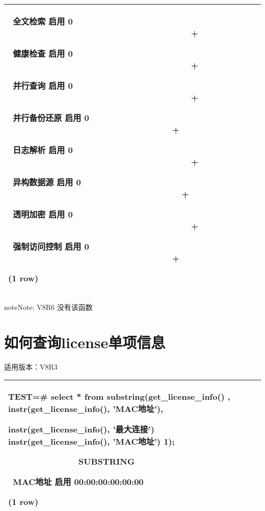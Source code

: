 \documentclass[letterpaper,10pt,english]{sphinxmanual}
\begin{document}
\begin{savenotes}
\begin{tabulary}{\linewidth}[t]{|T|}
 全文检索 \sphinxhyphen{}\sphinxhyphen{}\sphinxhyphen{} 启用 \sphinxhyphen{}\sphinxhyphen{}\sphinxhyphen{} 0                                        +

 健康检查 \sphinxhyphen{}\sphinxhyphen{}\sphinxhyphen{} 启用 \sphinxhyphen{}\sphinxhyphen{}\sphinxhyphen{} 0                                        +

 并行查询 \sphinxhyphen{}\sphinxhyphen{}\sphinxhyphen{} 启用 \sphinxhyphen{}\sphinxhyphen{}\sphinxhyphen{} 0                                        +

 并行备份还原 \sphinxhyphen{}\sphinxhyphen{}\sphinxhyphen{} 启用 \sphinxhyphen{}\sphinxhyphen{}\sphinxhyphen{} 0                                    +

 日志解析 \sphinxhyphen{}\sphinxhyphen{}\sphinxhyphen{} 启用 \sphinxhyphen{}\sphinxhyphen{}\sphinxhyphen{} 0                                        +

 异构数据源 \sphinxhyphen{}\sphinxhyphen{}\sphinxhyphen{} 启用 \sphinxhyphen{}\sphinxhyphen{}\sphinxhyphen{} 0                                      +

 透明加密 \sphinxhyphen{}\sphinxhyphen{}\sphinxhyphen{} 启用 \sphinxhyphen{}\sphinxhyphen{}\sphinxhyphen{} 0                                        +

 强制访问控制 \sphinxhyphen{}\sphinxhyphen{}\sphinxhyphen{} 启用 \sphinxhyphen{}\sphinxhyphen{}\sphinxhyphen{} 0                                    +

(1 row)
\\
\hline
\end{tabulary}
\par
\sphinxattableend\end{savenotes}

\begin{sphinxadmonition}{note}{Note:}
V8R6 没有该函数
\end{sphinxadmonition}


\section{如何查询license单项信息}
\label{\detokenize{license:id3}}
适用版本：V8R3


\begin{savenotes}\sphinxattablestart
\centering
\begin{tabulary}{\linewidth}[t]{|T|}
\hline

TEST=\# select * from substring(get\_license\_info() ,
instr(get\_license\_info(), 'MAC地址'),

instr(get\_license\_info(), '最大连接') \sphinxhyphen{} instr(get\_license\_info(),
'MAC地址') \sphinxhyphen{} 1);

               SUBSTRING

 MAC地址 \sphinxhyphen{}\sphinxhyphen{}\sphinxhyphen{} 启用 \sphinxhyphen{}\sphinxhyphen{}\sphinxhyphen{} 00:00:00:00:00:00

(1 row)
\\
\hline
\end{tabulary}
\par
\sphinxattableend\end{savenotes}
\end{document}
